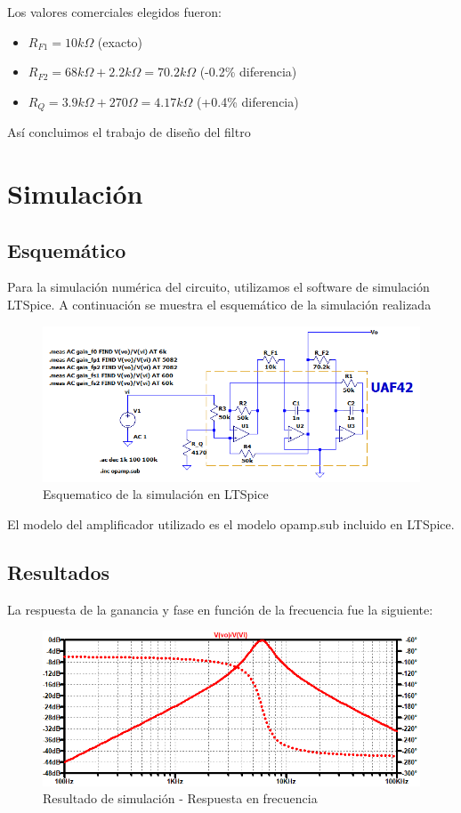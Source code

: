 \documentclass[11pt,a4paper]{report}
\begin{document}
Los valores comerciales elegidos fueron:

\begin{itemize}
    \item $R_{F1} = 10 k\Omega$ (exacto)
    \item $R_{F2} = 68k\Omega + 2.2k\Omega = 70.2k\Omega$  (-0.2\% diferencia)
    \item $R_Q = 3.9k\Omega + 270\Omega = 4.17k\Omega$  (+0.4\% diferencia)
\end{itemize}

Así concluimos el trabajo de diseño del filtro

\chapter{Simulación}

\section{Esquemático}

Para la simulación numérica del circuito, utilizamos el software de simulación LTSpice.
A continuación se muestra el esquemático de la simulación realizada

\begin{figure}[h]
\centering
\label{sim_sch}
\includegraphics[scale=0.8]{figs/sim_sch.png}
\caption{Esquematico de la simulación en LTSpice}
\end{figure}

El modelo del amplificador utilizado es el modelo opamp.sub incluido en LTSpice.

\section{Resultados}


La respuesta de la ganancia y fase en función de la frecuencia fue la siguiente:

\begin{figure}[H]
\centering
\includegraphics[scale=0.55]{figs/sim_plt.png}
\caption{Resultado de simulación - Respuesta en frecuencia}
\end{figure}
\end{document}
